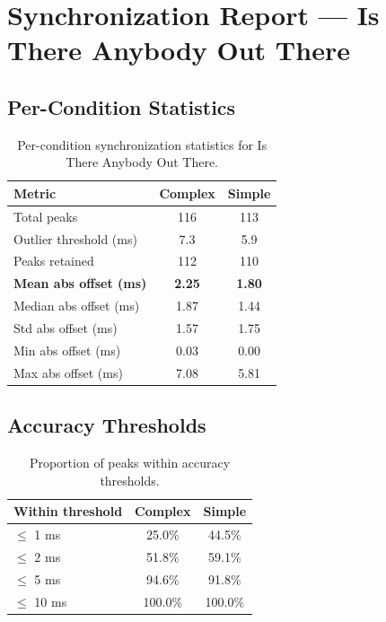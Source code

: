 
\section*{Synchronization Report --- Is There Anybody Out There}

\subsection*{Per-Condition Statistics}

\begin{table}[h!]
\centering
\begin{tabular}{|l|c|c|}
\hline
Metric & Complex & Simple \\
\hline
Total peaks & 116 & 113 \\
Outlier threshold (ms) & 7.3 & 5.9 \\
Peaks retained & 112 & 110 \\
\textbf{Mean abs offset (ms)} & \textbf{2.25} & \textbf{1.80} \\
Median abs offset (ms) & 1.87 & 1.44 \\
Std abs offset (ms) & 1.57 & 1.75 \\
Min abs offset (ms) & 0.03 & 0.00 \\
Max abs offset (ms) & 7.08 & 5.81 \\
\hline
\end{tabular}
\caption{Per-condition synchronization statistics for Is There Anybody Out There.}
\label{tab:sync_stats}
\end{table}

\subsection*{Accuracy Thresholds}

\begin{table}[h!]
\centering
\begin{tabular}{|l|c|c|}
\hline
Within threshold & Complex & Simple \\
\hline
$\leq$ 1 ms & 25.0\% & 44.5\% \\
$\leq$ 2 ms & 51.8\% & 59.1\% \\
$\leq$ 5 ms & 94.6\% & 91.8\% \\
$\leq$ 10 ms & 100.0\% & 100.0\% \\
\hline
\end{tabular}
\caption{Proportion of peaks within accuracy thresholds.}
\label{tab:sync_accuracy}
\end{table}

